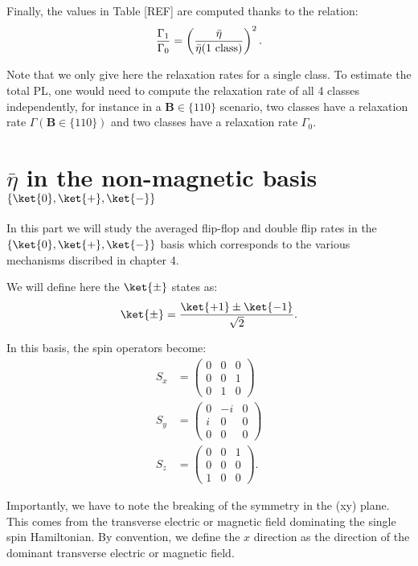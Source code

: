 \documentclass[a4paper,11pt]{report}
\begin{document}
Finally, the values in Table [REF] are computed thanks to the relation: \begin{equation}
\frac{\Gamma_1}{\Gamma_0}= \left(\frac{\bar \eta}{\bar \eta(\rm{1\ class})} \right)^2.
\end{equation}

Note that we only give here the relaxation rates for a single class. To estimate the total PL, one would need to compute the relaxation rate of all 4 classes independently, for instance in a $\mathbf{B} \in \{110\}$ scenario, two classes have a relaxation rate $\Gamma(\mathbf{B} \in \{110\})$ and two classes have a relaxation rate $\Gamma_0$.

\section{$\bar \eta$ in the non-magnetic basis $\{ \ket{0}, \ket{+}, \ket{-}\}$}

In this part we will study the averaged flip-flop and double flip rates in the $\{ \ket{0}, \ket{+}, \ket{-}\}$ basis which corresponds to the various mechanisms discribed in chapter 4.

We will define here the $\ket{\pm}$ states as:
\begin{equation}
\ket{\pm}=\frac{\ket{+1}\pm\ket{-1}}{\sqrt{2}}.
\end{equation}

In this basis, the spin operators become:
\begin{align*}
S_x&=\begin{pmatrix}
0&0&0 \\
0&0&1 \\
0&1&0
\end{pmatrix} \\
S_y&=\begin{pmatrix}
0&-i&0 \\
i&0&0 \\
0&0&0
\end{pmatrix} \\
S_z&=\begin{pmatrix}
0&0&1 \\
0&0&0 \\
1&0&0
\end{pmatrix}.
\end{align*}


Importantly, we have to note the breaking of the symmetry in the (xy) plane. This comes from the transverse electric or magnetic field dominating the single spin Hamiltonian. By convention, we define the $x$ direction as the direction of the dominant transverse electric or magnetic field.
\end{document}
